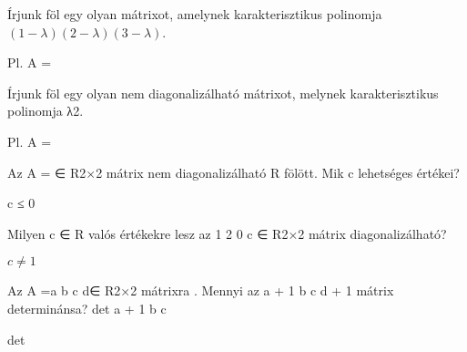 \begin{frame}
  \begin{tcolorbox}[title={8/2. -N-}]
     Írjunk föl egy olyan mátrixot, amelynek karakterisztikus polinomja $(1−λ)(2−λ)(3−λ)$.

  \tcblower

    \mmedskip 
    
     Pl. A =
  \end{tcolorbox}
\end{frame}


\begin{frame}
  \begin{tcolorbox}[title={8/3. -R-}]
    Írjunk föl egy olyan nem diagonalizálható mátrixot, melynek karakterisztikus polinomja λ2.

  \tcblower

    \mmedskip 
    
    Pl. A =
  \end{tcolorbox}
\end{frame}


\begin{frame}
  \begin{tcolorbox}[title={8/4. -Q-}]
    Az A =  ∈ R2×2 mátrix nem diagonalizálható R fölött. Mik c lehetséges értékei?


  \tcblower

    \mmedskip 
    
    c ≤ 0
  \end{tcolorbox}
\end{frame}


\begin{frame}
  \begin{tcolorbox}[title={8/5. -Q-}]
    Milyen c ∈ R valós értékekre lesz az 1 2 0 c ∈ R2×2 mátrix diagonalizálható?

  \tcblower

    \mmedskip 
    
     $c \neq 1$
  \end{tcolorbox}
\end{frame}


\begin{frame}
  \begin{tcolorbox}[title={8/6. -Q-}]
     Az A =a b c d∈ R2×2 mátrixra . Mennyi az a + 1 b c d + 1 mátrix determinánsa? det a + 1 b c 

  \tcblower

    \mmedskip 
    
     det
  \end{tcolorbox}
\end{frame}


